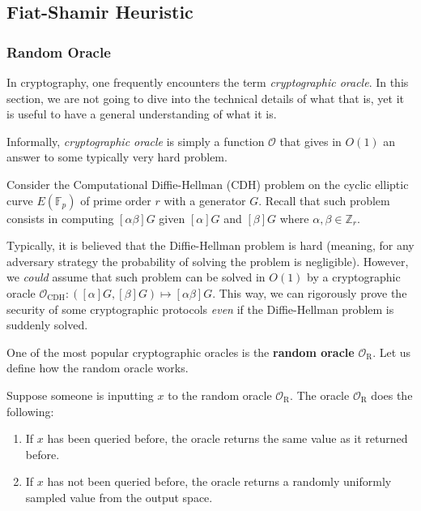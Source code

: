 \documentclass[../lecture-notes.tex]{subfiles}
\begin{document}
\subsection{Fiat-Shamir Heuristic}

\subsubsection{Random Oracle}

In cryptography, one frequently encounters the term \textit{cryptographic oracle}. In this section, we are not going to dive into the technical details of what that is, yet it is useful to have a general understanding of what it is.

\begin{definition}
    Informally, \textit{cryptographic oracle} is simply a function $\mathcal{O}$ that gives in $O(1)$ an answer to some typically very hard problem.     
\end{definition}

\begin{example}
    Consider the Computational Diffie-Hellman (CDH) problem on the cyclic elliptic curve $E(\mathbb{F}_p)$ of prime order $r$ with a generator $G$. Recall that such problem consists in computing $[\alpha\beta]G$ given $[\alpha]G$ and $[\beta]G$ where $\alpha,\beta \in \mathbb{Z}_r$. 

    Typically, it is believed that the Diffie-Hellman problem is hard (meaning, for any adversary strategy the probability of solving the problem is negligible). However, we \textit{could} assume that such problem can be solved in $O(1)$ by a cryptographic oracle $\mathcal{O}_{\text{CDH}}: ([\alpha]G,[\beta]G) \mapsto [\alpha\beta]G$. This way, we can rigorously prove the security of some cryptographic protocols \textit{even} if the Diffie-Hellman problem is suddenly solved. 
\end{example}

One of the most popular cryptographic oracles is the \textbf{random oracle} $\mathcal{O}_{\text{R}}$. Let us define how the random oracle works.

Suppose someone is inputting $x$ to the random oracle $\mathcal{O}_{\text{R}}$. The oracle $\mathcal{O}_{\text{R}}$ does the following:
\begin{enumerate}
    \item If $x$ has been queried before, the oracle returns the same value as it returned before.
    \item If $x$ has not been queried before, the oracle returns a randomly uniformly sampled value from the output space.
\end{enumerate}
\end{document}
